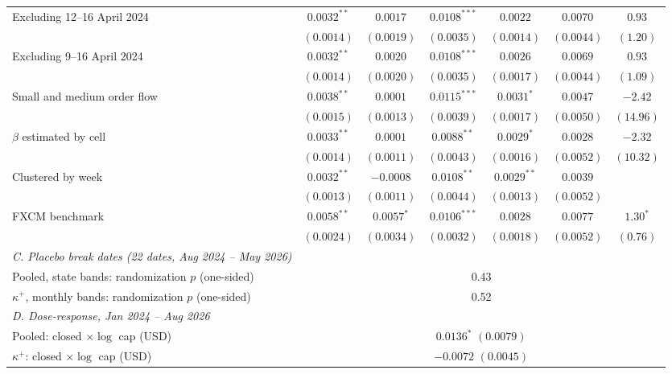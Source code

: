 \begin{tabular}{lcccccc}
Excluding 12--16 April 2024 & $0.0032^{**}$ & $0.0017$ & $0.0108^{***}$ & $0.0022$ & $0.0070$ & $0.93$ \\
 & $(0.0014)$ & $(0.0019)$ & $(0.0035)$ & $(0.0014)$ & $(0.0044)$ & $(1.20)$ \\
Excluding 9--16 April 2024 & $0.0032^{**}$ & $0.0020$ & $0.0108^{***}$ & $0.0026$ & $0.0069$ & $0.93$ \\
 & $(0.0014)$ & $(0.0020)$ & $(0.0035)$ & $(0.0017)$ & $(0.0044)$ & $(1.09)$ \\
Small and medium order flow & $0.0038^{**}$ & $0.0001$ & $0.0115^{***}$ & $0.0031^{*}$ & $0.0047$ & $-2.42$ \\
 & $(0.0015)$ & $(0.0013)$ & $(0.0039)$ & $(0.0017)$ & $(0.0050)$ & $(14.96)$ \\
$\beta$ estimated by cell & $0.0033^{**}$ & $0.0001$ & $0.0088^{**}$ & $0.0029^{*}$ & $0.0028$ & $-2.32$ \\
 & $(0.0014)$ & $(0.0011)$ & $(0.0043)$ & $(0.0016)$ & $(0.0052)$ & $(10.32)$ \\
Clustered by week & $0.0032^{**}$ & $-0.0008$ & $0.0108^{**}$ & $0.0029^{**}$ & $0.0039$ &  \\
 & $(0.0013)$ & $(0.0011)$ & $(0.0044)$ & $(0.0013)$ & $(0.0052)$ &  \\
FXCM benchmark & $0.0058^{**}$ & $0.0057^{*}$ & $0.0106^{***}$ & $0.0028$ & $0.0077$ & $1.30^{*}$ \\
 & $(0.0024)$ & $(0.0034)$ & $(0.0032)$ & $(0.0018)$ & $(0.0052)$ & $(0.76)$ \\
\midrule
\emph{C. Placebo break dates (22 dates, Aug 2024 -- May 2026)} & & & & & & \\
Pooled, state bands: randomization $p$ (one-sided) & \multicolumn{6}{c}{0.43} \\
$\kappa^+$, monthly bands: randomization $p$ (one-sided) & \multicolumn{6}{c}{0.52} \\
\emph{D. Dose-response, Jan 2024 -- Aug 2026} & & & & & & \\
Pooled: closed $\times\log$ cap (USD) & \multicolumn{6}{c}{$0.0136^{*}$ $(0.0079)$} \\
$\kappa^+$: closed $\times\log$ cap (USD) & \multicolumn{6}{c}{$-0.0072$ $(0.0045)$} \\
\bottomrule
\end{tabular}
